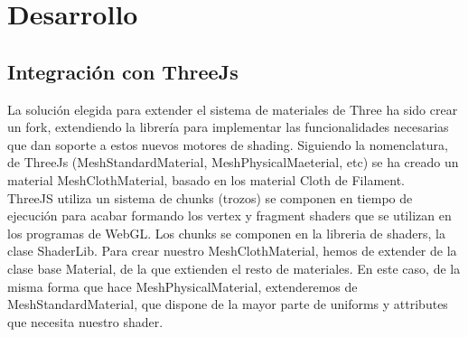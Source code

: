 \chapter{Desarrollo}

\section{Integraci\'on con ThreeJs}
La soluci\'on elegida para extender el sistema de materiales de Three ha sido crear un fork, extendiendo la
librer\'ia para implementar las funcionalidades necesarias que dan soporte a estos nuevos motores de shading.
Siguiendo la nomenclatura, de ThreeJs (MeshStandardMaterial, MeshPhysicalMaeterial, etc) se ha creado un material
MeshClothMaterial, basado en los material Cloth de Filament.\\
ThreeJS utiliza un sistema de chunks (trozos) se componen en tiempo de ejecuci\'on para acabar formando los vertex
y fragment shaders que se utilizan en los programas de WebGL. Los chunks se componen en la libreria de shaders, la
clase ShaderLib.
Para crear nuestro MeshClothMaterial, hemos de extender de la clase base Material, de la que extienden el resto de
materiales. En este caso, de la misma forma que hace MeshPhysicalMaterial, extenderemos de MeshStandardMaterial,
que dispone de la mayor parte de uniforms y attributes que necesita nuestro shader.\\

